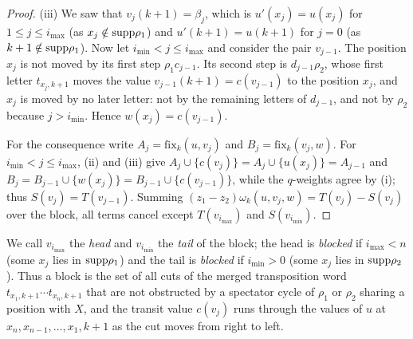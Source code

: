 \documentclass{amsart}
\theoremstyle{definition}
\theoremstyle{remark}
\numberwithin{equation}{section}
\newcommand{\fx}{\mathrm{fix}}
\begin{document}
\begin{proof}
(iii) We saw that $v_j(k+1)=\beta_j$, which is $u'(x_j)=u(x_j)$ for $1\leq j\leq i_{\max}$ (as $x_j\notin\mathrm{supp}\rho_1$) and $u'(k+1)=u(k+1)$ for $j=0$ (as $k+1\notin\mathrm{supp}\rho_1$). Now let $i_{\min}<j\leq i_{\max}$ and consider the pair $v_{j-1}$. The position $x_j$ is not moved by its first step $\rho_1c_{j-1}$. Its second step is $d_{j-1}\rho_2$, whose first letter $t_{x_j,k+1}$ moves the value $v_{j-1}(k+1)=c(v_{j-1})$ to the position $x_j$, and $x_j$ is moved by no later letter: not by the remaining letters of $d_{j-1}$, and not by $\rho_2$ because $j>i_{\min}$. Hence $w(x_j)=c(v_{j-1})$.

For the consequence write $A_j=\fx_k(u,v_j)$ and $B_j=\fx_k(v_j,w)$. For $i_{\min}<j\leq i_{\max}$, (ii) and (iii) give $A_j\cup\{c(v_j)\}=A_j\cup\{u(x_j)\}=A_{j-1}$ and $B_j=B_{j-1}\cup\{w(x_j)\}=B_{j-1}\cup\{c(v_{j-1})\}$, while the $q$-weights agree by (i); thus $S(v_j)=T(v_{j-1})$. Summing $(z_1-z_2)\omega_k(u,v_j,w)=T(v_j)-S(v_j)$ over the block, all terms cancel except $T(v_{i_{\max}})$ and $S(v_{i_{\min}})$.
\end{proof}

We call $v_{i_{\max}}$ the \emph{head} and $v_{i_{\min}}$ the \emph{tail} of the block; the head is \emph{blocked} if $i_{\max}<n$ (some $x_j$ lies in $\mathrm{supp}\rho_1$) and the tail is \emph{blocked} if $i_{\min}>0$ (some $x_j$ lies in $\mathrm{supp}\rho_2$). Thus a block is the set of all cuts of the merged transposition word $t_{x_1,k+1}\cdots t_{x_n,k+1}$ that are not obstructed by a spectator cycle of $\rho_1$ or $\rho_2$ sharing a position with $X$, and the transit value $c(v_j)$ runs through the values of $u$ at $x_n,x_{n-1},\ldots,x_1,k+1$ as the cut moves from right to left.
\end{document}
